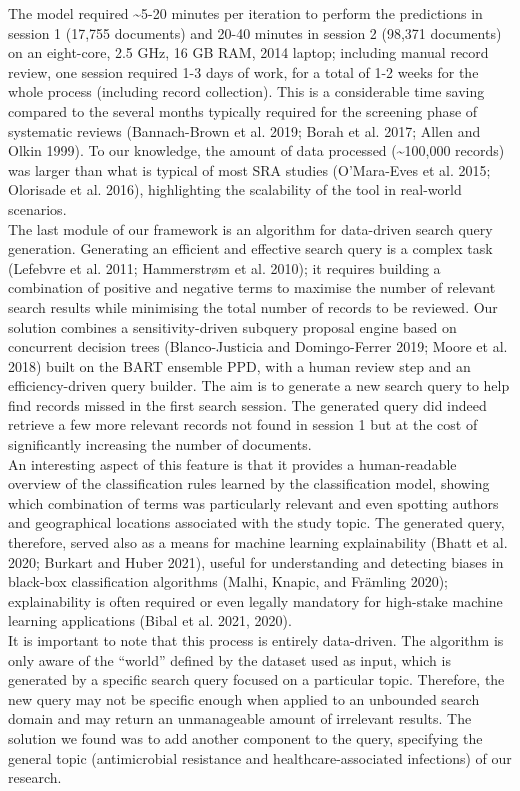 \documentclass{article}
\begin{document}
The model required \textasciitilde5-20 minutes per iteration to perform
the predictions in session 1 (17,755 documents) and 20-40 minutes in
session 2 (98,371 documents) on an eight-core, 2.5 GHz, 16 GB RAM, 2014
laptop; including manual record review, one session required 1-3 days of
work, for a total of 1-2 weeks for the whole process (including record
collection). This is a considerable time saving compared to the several
months typically required for the screening phase of systematic reviews
(Bannach-Brown et al. 2019; Borah et al. 2017; Allen and Olkin 1999). To
our knowledge, the amount of data processed (\textasciitilde100,000
records) was larger than what is typical of most SRA studies
(O'Mara-Eves et al. 2015; Olorisade et al. 2016), highlighting the
scalability of the tool in real-world scenarios.\\

The last module of our framework is an algorithm for data-driven search
query generation. Generating an efficient and effective search query is
a complex task (Lefebvre et al. 2011; Hammerstrøm et al. 2010); it
requires building a combination of positive and negative terms to
maximise the number of relevant search results while minimising the
total number of records to be reviewed. Our solution combines a
sensitivity-driven subquery proposal engine based on concurrent decision
trees (Blanco-Justicia and Domingo-Ferrer 2019; Moore et al. 2018) built
on the BART ensemble PPD, with a human review step and an
efficiency-driven query builder. The aim is to generate a new search
query to help find records missed in the first search session. The
generated query did indeed retrieve a few more relevant records not
found in session 1 but at the cost of significantly increasing the
number of documents.\\
An interesting aspect of this feature is that it provides a
human-readable overview of the classification rules learned by the
classification model, showing which combination of terms was
particularly relevant and even spotting authors and geographical
locations associated with the study topic. The generated query,
therefore, served also as a means for machine learning explainability
(Bhatt et al. 2020; Burkart and Huber 2021), useful for understanding
and detecting biases in black-box classification algorithms (Malhi,
Knapic, and Främling 2020); explainability is often required or even
legally mandatory for high-stake machine learning applications (Bibal et
al. 2021, 2020).\\
It is important to note that this process is entirely data-driven. The
algorithm is only aware of the ``world'' defined by the dataset used as
input, which is generated by a specific search query focused on a
particular topic. Therefore, the new query may not be specific enough
when applied to an unbounded search domain and may return an
unmanageable amount of irrelevant results. The solution we found was to
add another component to the query, specifying the general topic
(antimicrobial resistance and healthcare-associated infections) of our
research.\\
\end{document}

